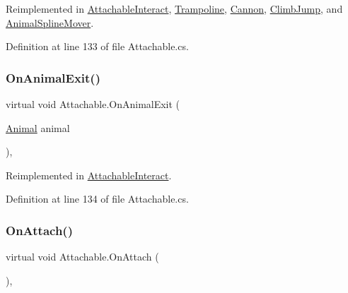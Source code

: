 Reimplemented in \mbox{\hyperlink{class_attachable_interact_a376127af23be5456604ee5ec39f02b9b}{Attachable\+Interact}}, \mbox{\hyperlink{class_trampoline_a593abd52ed17139a320ee418aff6b120}{Trampoline}}, \mbox{\hyperlink{class_cannon_a972f062f1aba8d3f3ab95e47c6129506}{Cannon}}, \mbox{\hyperlink{class_climb_jump_a66b008bb35c83a5cf66d7f70ca0c4acf}{Climb\+Jump}}, and \mbox{\hyperlink{class_animal_spline_mover_acadeba87020c2abcea749a5a522fff54}{Animal\+Spline\+Mover}}.



Definition at line 133 of file Attachable.\+cs.

\mbox{\label{class_attachable_a6de7e01430734a291be84f3065b45537}} 
\subsubsection{\texorpdfstring{On\+Animal\+Exit()}{OnAnimalExit()}}
{\footnotesize\ttfamily virtual void Attachable.\+On\+Animal\+Exit (\begin{DoxyParamCaption}\item[{\mbox{\hyperlink{class_animal}{Animal}}}]{animal }\end{DoxyParamCaption})\hspace{0.3cm}{\ttfamily [protected]}, {\ttfamily [virtual]}}



Reimplemented in \mbox{\hyperlink{class_attachable_interact_a072c261c7ec9235f62c441fbac876b8f}{Attachable\+Interact}}.



Definition at line 134 of file Attachable.\+cs.

\mbox{\label{class_attachable_a813281e423def538cd834f0db80c9ec8}} 
\subsubsection{\texorpdfstring{On\+Attach()}{OnAttach()}}
{\footnotesize\ttfamily virtual void Attachable.\+On\+Attach (\begin{DoxyParamCaption}{ }\end{DoxyParamCaption})\hspace{0.3cm}{\ttfamily [protected]}, {\ttfamily [virtual]}}



